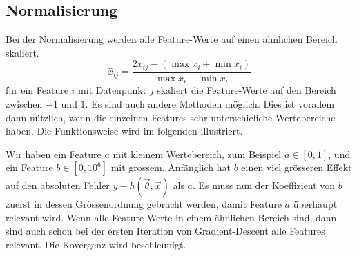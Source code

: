 \subsection{Normalisierung}

Bei der Normalisierung werden alle Feature-Werte auf einen ähnlichen Bereich skaliert.
\begin{equation}
    \hat x_{ij} = \frac{2x_{ij} - (\max x_i + \min x_i)}{\max x_i - \min x_i}
\end{equation}
für ein Feature $i$ mit Datenpunkt $j$ skaliert die Feature-Werte auf den Bereich zwischen $-1$
und $1$. Es sind auch andere Methoden möglich. Dies ist vorallem dann nützlich, wenn die
einzelnen Features sehr unterschieliche Wertebereiche haben.
Die Funktionsweise wird im folgenden illustriert.

Wir haben ein Feature $a$ mit kleinem Wertebereich, zum Beispiel $a \in [0, 1]$, und ein
Feature $b \in [0, 10^6]$ mit grossem. Anfänglich hat $b$ einen viel grösseren
Effekt auf den absoluten Fehler $y - h(\vec \theta, \vec x)$ als $a$. Es muss nun
der Koeffizient von $b$ zuerst in dessen Grössenordnung gebracht werden, damit Feature $a$
überhaupt relevant wird. Wenn alle Feature-Werte in einem ähnlichen Bereich sind,
dann sind auch schon bei der ersten Iteration von Gradient-Descent alle Features relevant. Die
Kovergenz wird beschleunigt.
